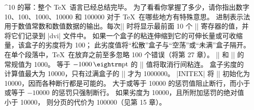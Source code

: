 \ddangerexercise ^{10 的幂}：整个 \TeX\ 语言已经总结完毕。
为了看看你掌握了多少，请你指出数字 10、100、1000、10000 和 100000 对于
\TeX\ 在哪些地方有特殊意思。
 进制表示法用于数值常数和数值数据的输出。每次|\shipout|
时将显示最前面 10 个 |\count| 寄存器的值，并将它们记录到 |dvi| 文件中。
如果一个盒子的粘连伸缩到它的可伸长量或可收缩量，该盒子的劣度将为 100；
此劣度值将``松散''盒子与``空荡''或``未满''盒子隔开。
在单个段落中，\TeX\ 在放弃之前至多忽略 100 个错误（将第 27 章）。
|\spacefactor| 和 |\mag| 的常规值为 1000。
等于 $-1000\pt$ 的 |\prevdepth| 值将取消行间粘连。
盒子劣度的计算值最大为 10000，只有过满盒子的 |\badness| 才为 1000000。
|INITEX| 将 |\tolerance| 初始化为 10000，因而各种断行都是可能的。
大于或等于 10000 的惩罚值阻止断行，而小于或等于 $-10000$ 的惩罚只强制断行。
如果劣度为 10000，且所附加惩罚的绝对值小于 10000，
则分页的代价为 100000（见第 15 章）。

